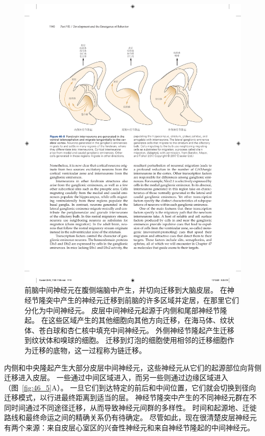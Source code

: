 \begin{figure}[htbp]
	\centering
	\includegraphics[width=0.95\linewidth]{chap46/fig_46_8}
	\caption{前脑中间神经元在腹侧端脑中产生，并切向迁移到大脑皮层。
		在神经节隆突中产生的神经元迁移到前脑的许多区域并定居，在那里它们分化为中间神经元。
		皮层中间神经元起源于内侧和尾部神经节隆起。
		在这些区域产生的其他细胞向其他方向迁移，在海马体、纹状体、苍白球和杏仁核中填充中间神经元。
		外侧神经节隆起产生迁移到纹状体和嗅球的细胞。
		迁移到灯泡的细胞使用相邻的迁移细胞作为迁移的底物，这一过程称为链迁移\cite{bandler2017cortical}。}
	\label{fig:46_8}
\end{figure}


内侧和中央隆起产生大部分皮层中间神经元，这些神经元从它们的起源部位向背侧迁移进入皮层。
一些通过中间区域进入，而另一些则通过边缘区域进入（图~\ref{fig:46_5}A）。
一旦它们到达特定的前后和中间位置，它们就会切换到径向迁移模式，以行进最终距离到适当的层。
神经节隆突中产生的不同神经元群在不同时间通过不同途径迁移，从而导致神经元间群的多样性。
时间和起源地、迁徙路线和最终命运之间的精确关系仍有待确定。
尽管如此，现在很清楚皮层神经元有两个来源：来自皮层心室区的兴奋性神经元和来自神经节隆起的中间神经元。



